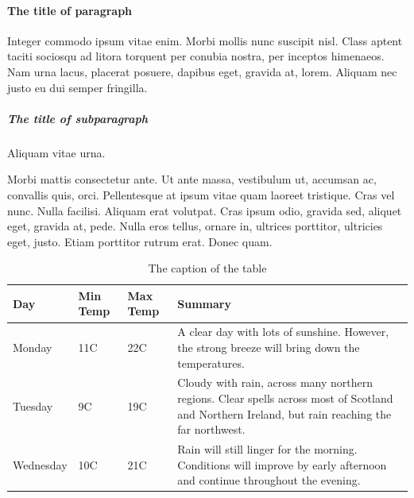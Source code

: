 \documentclass{jacsart}
\begin{document}
\paragraph{The title of paragraph}
Integer commodo ipsum vitae enim. Morbi mollis nunc suscipit nisl.
Class aptent taciti sociosqu ad litora torquent per conubia nostra, per
inceptos himenaeos. Nam urna lacus, placerat posuere, dapibus eget, gravida
at, lorem. Aliquam nec justo eu dui semper fringilla. 

\subparagraph{The title of subparagraph}
Aliquam vitae urna.

Morbi mattis consectetur ante. Ut ante massa, vestibulum ut, accumsan ac,
convallis quis, orci. Pellentesque at ipsum vitae quam laoreet tristique. Cras
vel nunc. Nulla facilisi. Aliquam erat volutpat. Cras ipsum
odio, gravida sed, aliquet eget, gravida at, pede. Nulla eros tellus, ornare
in, ultrices porttitor, ultricies eget, justo. Etiam porttitor rutrum erat.
Donec quam.

\begin{table}[!t]
\caption{The caption of the table} 
\centering
\begin{tabular}{ | l | l | l | p{5cm} |}
\hline
\bf Day & \bf Min Temp & \bf  Max Temp & \bf Summary \\ \hline
Monday & 11C & 22C & A clear day with lots of sunshine.  
However, the strong breeze will bring down the temperatures. \\ \hline
Tuesday & 9C & 19C & Cloudy with rain, across many northern regions. Clear spells 
across most of Scotland and Northern Ireland, 
but rain reaching the far northwest. \\ \hline
Wednesday & 10C & 21C & Rain will still linger for the morning. 
Conditions will improve by early afternoon and continue 
throughout the evening. \\
\hline
\end{tabular}
\label{label-of-table}
\end{table}

 
\end{document}
